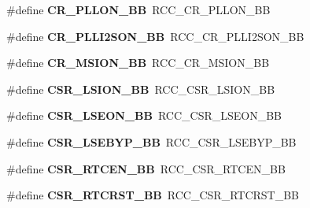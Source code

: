 \begin{DoxyCompactItemize}
\item 
\#define {\bfseries C\+R\+\_\+\+P\+L\+L\+O\+N\+\_\+\+BB}~R\+C\+C\+\_\+\+C\+R\+\_\+\+P\+L\+L\+O\+N\+\_\+\+BB\hypertarget{group___h_a_l___r_c_c___aliased_ga3f1fb2589cb8b5ac2f7121aba1135a5f}{}\label{group___h_a_l___r_c_c___aliased_ga3f1fb2589cb8b5ac2f7121aba1135a5f}

\item 
\#define {\bfseries C\+R\+\_\+\+P\+L\+L\+I2\+S\+O\+N\+\_\+\+BB}~R\+C\+C\+\_\+\+C\+R\+\_\+\+P\+L\+L\+I2\+S\+O\+N\+\_\+\+BB\hypertarget{group___h_a_l___r_c_c___aliased_ga0c0fb27aba4eb660f7590252596bdfc5}{}\label{group___h_a_l___r_c_c___aliased_ga0c0fb27aba4eb660f7590252596bdfc5}

\item 
\#define {\bfseries C\+R\+\_\+\+M\+S\+I\+O\+N\+\_\+\+BB}~R\+C\+C\+\_\+\+C\+R\+\_\+\+M\+S\+I\+O\+N\+\_\+\+BB\hypertarget{group___h_a_l___r_c_c___aliased_gac80b5fd1d6f839cc29c9272d47742907}{}\label{group___h_a_l___r_c_c___aliased_gac80b5fd1d6f839cc29c9272d47742907}

\item 
\#define {\bfseries C\+S\+R\+\_\+\+L\+S\+I\+O\+N\+\_\+\+BB}~R\+C\+C\+\_\+\+C\+S\+R\+\_\+\+L\+S\+I\+O\+N\+\_\+\+BB\hypertarget{group___h_a_l___r_c_c___aliased_gaa253e36e7e5fb02998c0e4d0388abc52}{}\label{group___h_a_l___r_c_c___aliased_gaa253e36e7e5fb02998c0e4d0388abc52}

\item 
\#define {\bfseries C\+S\+R\+\_\+\+L\+S\+E\+O\+N\+\_\+\+BB}~R\+C\+C\+\_\+\+C\+S\+R\+\_\+\+L\+S\+E\+O\+N\+\_\+\+BB\hypertarget{group___h_a_l___r_c_c___aliased_ga213e54878ac3849d9ea59567cf73bac2}{}\label{group___h_a_l___r_c_c___aliased_ga213e54878ac3849d9ea59567cf73bac2}

\item 
\#define {\bfseries C\+S\+R\+\_\+\+L\+S\+E\+B\+Y\+P\+\_\+\+BB}~R\+C\+C\+\_\+\+C\+S\+R\+\_\+\+L\+S\+E\+B\+Y\+P\+\_\+\+BB\hypertarget{group___h_a_l___r_c_c___aliased_gac7c26259006de79c8754693af9712d1a}{}\label{group___h_a_l___r_c_c___aliased_gac7c26259006de79c8754693af9712d1a}

\item 
\#define {\bfseries C\+S\+R\+\_\+\+R\+T\+C\+E\+N\+\_\+\+BB}~R\+C\+C\+\_\+\+C\+S\+R\+\_\+\+R\+T\+C\+E\+N\+\_\+\+BB\hypertarget{group___h_a_l___r_c_c___aliased_gac3641969630c9b8eb0f5da2f164a5892}{}\label{group___h_a_l___r_c_c___aliased_gac3641969630c9b8eb0f5da2f164a5892}

\item 
\#define {\bfseries C\+S\+R\+\_\+\+R\+T\+C\+R\+S\+T\+\_\+\+BB}~R\+C\+C\+\_\+\+C\+S\+R\+\_\+\+R\+T\+C\+R\+S\+T\+\_\+\+BB\hypertarget{group___h_a_l___r_c_c___aliased_ga55aab5ed906bf71760d81cc5acefd55c}{}\label{group___h_a_l___r_c_c___aliased_ga55aab5ed906bf71760d81cc5acefd55c}


\end{DoxyCompactItemize}
